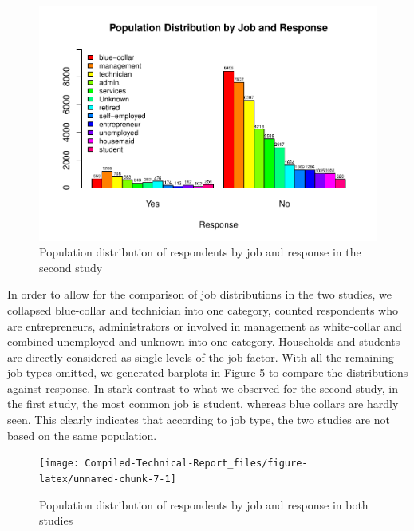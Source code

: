 \documentclass[]{article}
\begin{document}
\begin{figure}

{\centering \includegraphics{Compiled-Technical-Report_files/figure-latex/unnamed-chunk-5-1} 

}

\caption{Population distribution of respondents by job and response in the second study}\label{fig:unnamed-chunk-5}
\end{figure}

In order to allow for the comparison of job distributions in the two
studies, we collapsed blue-collar and technician into one category,
counted respondents who are entrepreneurs, administrators or involved in
management as white-collar and combined unemployed and unknown into one
category. Households and students are directly considered as single
levels of the job factor. With all the remaining job types omitted, we
generated barplots in Figure 5 to compare the distributions against
response. In stark contrast to what we observed for the second study, in
the first study, the most common job is student, whereas blue collars
are hardly seen. This clearly indicates that according to job type, the
two studies are not based on the same population.

\begin{figure}

{\centering \texttt{[image: Compiled-Technical-Report\_files/figure-latex/unnamed-chunk-7-1]} 

}

\caption{Population distribution of respondents by job and response in both studies}\label{fig:unnamed-chunk-7}
\end{figure}
\end{document}
